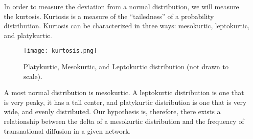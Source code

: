 In order to measure the deviation from a normal distribution, we will
measure the kurtosis. Kurtosis is a measure of the ``tailedness'' of a
probability distribution. Kurtosis can be characterized in three ways:
mesokurtic, leptokurtic, and platykurtic.

\begin{figure}[H]
  \centering
  \texttt{[image: kurtosis.png]}
  \caption{Platykurtic, Mesokurtic, and Leptokurtic distribution (not drawn to scale).}
\end{figure}

A most normal distribution is mesokurtic. A leptokurtic distribution
is one that is very peaky, it has a tall center, and platykurtic
distribution is one that is very wide, and evenly distributed. Our
hypothesis is, therefore, there exists a relationship between the
delta of a mesokurtic distribution and the frequency of transnational
diffusion in a given network.
